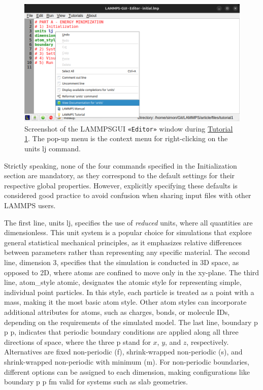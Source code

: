 \documentclass[9pt,tutorial]{livecoms}
\newcommand{\lmpcmd}[1]{\hspace{0pt}\colorbox{listing}{\textcolor{command}{\small{#1}}}\hspace{0pt}} %
\newcommand{\guicmd}[1]{\textcolor{command}{\texttt{«#1»}}} %
\newcommand{\lammpsgui}{\textsf{LAMMPS\textendash GUI}}
\begin{document}
\begin{figure}
\centering
\includegraphics[width=0.85\linewidth]{GUI-1.png}
\caption{Screenshot of the \lammpsgui{} \guicmd{Editor} window during
  \hyperref[lennard-jones-label]{Tutorial 1}.  The pop-up menu is the
  context menu for right-clicking on the \lmpcmd{units lj} command.}
\label{fig:GUI-1}
\end{figure}

\begin{note}
  Strictly speaking, none of the four commands specified in the
  Initialization section are mandatory, as they correspond to the
  default settings for their respective global properties.  However,
  explicitly specifying these defaults is considered good practice to
  avoid confusion when sharing input files with other LAMMPS users.
\end{note}

The first line, \lmpcmd{units lj}, specifies the use of \emph{reduced}
units, where all quantities are dimensionless.  This unit system is a
popular choice for simulations that explore general statistical
mechanical principles, as it emphasizes relative differences between
parameters rather than representing any specific material.  The second
line, \lmpcmd{dimension 3}, specifies that the simulation is conducted
in 3D space, as opposed to 2D, where atoms are confined to move only in
the xy-plane.  The third line, \lmpcmd{atom\_style atomic}, designates
the atomic style for representing simple, individual point particles.
In this style, each particle is treated as a point with a mass, making
it the most basic atom style.  Other atom styles can incorporate
additional attributes for atoms, such as charges, bonds, or molecule
IDs, depending on the requirements of the simulated model.  The last
line, \lmpcmd{boundary p p p}, indicates that periodic boundary
conditions are applied along all three directions of space, where the
three p stand for $x$, $y$, and $z$, respectively.  Alternatives are
fixed non-periodic (f), shrink-wrapped non-periodic (s), and
shrink-wrapped non-periodic with minimum (m).  For non-periodic
boundaries, different options can be assigned to each dimension, making
configurations like \lmpcmd{boundary p p fm} valid for systems such as
slab geometries.
\end{document}
